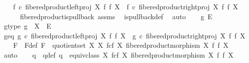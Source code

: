 \begin{isabellebody}
\ \ \isamarkupfalse%
\ {\isachardoublequoteopen}f\ {\isasymcirc}\isactrlsub c\ fibered{\isacharunderscore}{\kern0pt}product{\isacharunderscore}{\kern0pt}left{\isacharunderscore}{\kern0pt}proj\ X\ f\ f\ X\ {\isacharequal}{\kern0pt}\ f\ {\isasymcirc}\isactrlsub c\ fibered{\isacharunderscore}{\kern0pt}product{\isacharunderscore}{\kern0pt}right{\isacharunderscore}{\kern0pt}proj\ X\ f\ f\ X{\isachardoublequoteclose}\isanewline
\ \ \ \ \isamarkupfalse%
\ fibered{\isacharunderscore}{\kern0pt}product{\isacharunderscore}{\kern0pt}is{\isacharunderscore}{\kern0pt}pullback\ assms\ \isamarkupfalse%
\ is{\isacharunderscore}{\kern0pt}pullback{\isacharunderscore}{\kern0pt}def\ \isamarkupfalse%
\ auto\isanewline
{}\isamarkupfalse%
\isanewline
\ \ \isamarkupfalse%
\ g\ E\isanewline
\ \ \isamarkupfalse%
\ g{\isacharunderscore}{\kern0pt}type{\isacharcolon}{\kern0pt}\ {\isachardoublequoteopen}g\ {\isacharcolon}{\kern0pt}\ X\ {\isasymrightarrow}\ E{\isachardoublequoteclose}\isanewline
\ \ \isamarkupfalse%
\ g{\isacharunderscore}{\kern0pt}eq{\isacharcolon}{\kern0pt}\ {\isachardoublequoteopen}g\ {\isasymcirc}\isactrlsub c\ fibered{\isacharunderscore}{\kern0pt}product{\isacharunderscore}{\kern0pt}left{\isacharunderscore}{\kern0pt}proj\ X\ f\ f\ X\ {\isacharequal}{\kern0pt}\ g\ {\isasymcirc}\isactrlsub c\ fibered{\isacharunderscore}{\kern0pt}product{\isacharunderscore}{\kern0pt}right{\isacharunderscore}{\kern0pt}proj\ X\ f\ f\ X{\isachardoublequoteclose}\isanewline
\isanewline
\ \ \isamarkupfalse%
\ F\ \ F{\isacharunderscore}{\kern0pt}def{\isacharcolon}{\kern0pt}\ {\isachardoublequoteopen}F\ {\isacharequal}{\kern0pt}\ quotient{\isacharunderscore}{\kern0pt}set\ X\ {\isacharparenleft}{\kern0pt}X\ \isactrlbsub f\isactrlesub {\isasymtimes}\isactrlsub c\isactrlbsub f\isactrlesub \ X{\isacharcomma}{\kern0pt}\ fibered{\isacharunderscore}{\kern0pt}product{\isacharunderscore}{\kern0pt}morphism\ X\ f\ f\ X{\isacharparenright}{\kern0pt}{\isachardoublequoteclose}\isanewline
\ \ \ \ \isamarkupfalse%
\ auto\isanewline
\ \ \isamarkupfalse%
\ q\ \ q{\isacharunderscore}{\kern0pt}def{\isacharcolon}{\kern0pt}\ {\isachardoublequoteopen}q\ {\isacharequal}{\kern0pt}\ equiv{\isacharunderscore}{\kern0pt}class\ {\isacharparenleft}{\kern0pt}X\ \isactrlbsub f\isactrlesub {\isasymtimes}\isactrlsub c\isactrlbsub f\isactrlesub \ X{\isacharcomma}{\kern0pt}\ fibered{\isacharunderscore}{\kern0pt}product{\isacharunderscore}{\kern0pt}morphism\ X\ f\ f\ X{\isacharparenright}{\kern0pt}{\isachardoublequoteclose}\isanewline

\end{isabellebody}
